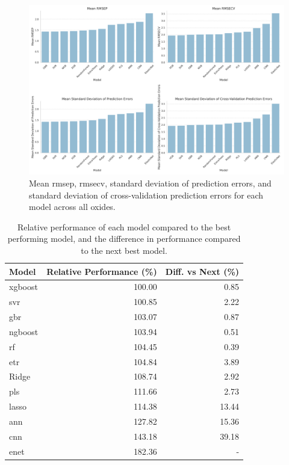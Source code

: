 \begin{figure}[h]
    \centering
    \includegraphics[width=\textwidth]{images/init_results_means.png}
    \caption{Mean \gls{rmsep}, \gls{rmsecv}, standard deviation of prediction errors, and standard deviation of cross-validation prediction errors for each model across all oxides.}
    \label{fig:init_results_rmses}
\end{figure}

\begin{table}[ht]
\centering
\begin{tabularx}{\linewidth}{lrr}
\toprule
Model & Relative Performance (\%) & Diff. vs Next (\%) \\
\midrule
\gls{xgboost} & 100.00 & 0.85 \\
\gls{svr} & 100.85 & 2.22 \\
\gls{gbr} & 103.07 & 0.87 \\
\gls{ngboost} & 103.94 & 0.51 \\
\gls{rf} & 104.45 & 0.39 \\
\gls{etr} & 104.84 & 3.89 \\
Ridge & 108.74 & 2.92 \\
\gls{pls} & 111.66 & 2.73 \\
\gls{lasso} & 114.38 & 13.44 \\
\gls{ann} & 127.82 & 15.36 \\
\gls{cnn} & 143.18 & 39.18 \\
\gls{enet} & 182.36 & - \\
\bottomrule
\end{tabularx}
\caption{Relative performance of each model compared to the best performing model, and the difference in performance compared to the next best model.}
\label{tab:relative_performance}
\end{table}

